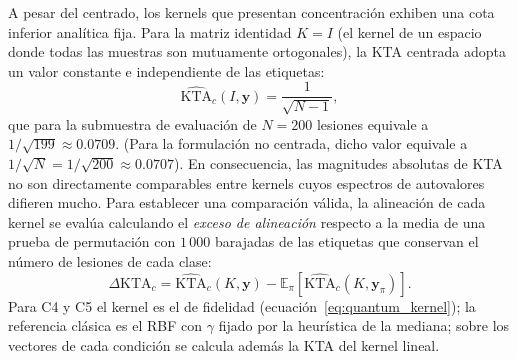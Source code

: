 A pesar del centrado, los kernels que presentan concentración exhiben una cota
inferior analítica fija. Para la matriz identidad $K = I$ (el kernel de un espacio donde todas
las muestras son mutuamente ortogonales), la KTA centrada adopta un valor
constante e independiente de las etiquetas:
\begin{equation}
  \widehat{\text{KTA}}_c(I, \mathbf{y}) = \frac{1}{\sqrt{N - 1}},
  \label{eq:kta_identity_floor}
\end{equation}
que para la submuestra de evaluación de $N = 200$ lesiones equivale a $1/\sqrt{199} \approx 0.0709$.
(Para la formulación no centrada, dicho valor equivale a $1/\sqrt{N} = 1/\sqrt{200} \approx 0.0707$).
En consecuencia, las magnitudes absolutas de KTA no son directamente comparables entre kernels
cuyos espectros de autovalores difieren mucho. Para establecer una comparación válida,
la alineación de cada kernel se evalúa calculando el \textit{exceso de alineación} respecto a
la media de una prueba de permutación con $1\,000$ barajadas de las etiquetas que
conservan el número de lesiones de cada clase:
\begin{equation}
  \Delta\text{KTA}_c = \widehat{\text{KTA}}_c(K, \mathbf{y}) - \mathbb{E}_{\pi}\left[\widehat{\text{KTA}}_c(K, \mathbf{y}_\pi)\right].
  \label{eq:kta_excess}
\end{equation}
Para C4 y C5 el kernel es el de fidelidad (ecuación~\eqref{eq:quantum_kernel}); la referencia clásica es el RBF con $\gamma$ fijado por la heurística de la mediana; sobre los vectores de cada condición se calcula además la KTA del kernel lineal.

